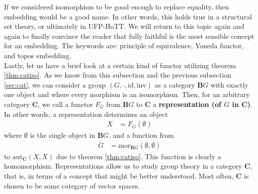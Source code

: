 If we considered isomorphism to be good enough to replace equality, then embedding would be a good name.
In other words, this holds true in a structural set theory, or ultimately in UFP-HoTT.
We will return to this topic again and again to finally convince the reader that fully faithful is the most sensible concept for an embedding.
The keywords are: principle of equivalence, Yoneda functor, and topos embedding.
\\
Lastly, let us have a brief look at a certain kind of functor utilizing theorem \ref{thm:catiso}.
As we know from this subsection and the previous subsection \ref{sec:cat}, we can consider a group $(G,\cdot,\mathrm{id},\mathrm{inv})$ as a category $\mathbf{B}G$ with exactly one object and where every morphism is an isomorphism.
Then, for an arbitrary category $\mathbf{C}$, we call a functor $F_{G}$ from $\mathbf{B}G$ to $\mathbf{C}$ a \textbf{representation (of $G$ in $\mathbf{C}$)}.
In other words, a representation determines an object
\begin{align*}
  X
  &=
  F_{G}(\emptyset)
\end{align*}
where $\emptyset$ is the single object in $\mathbf{B}G$, and a function from
\begin{align*}
  G
  &=
  \mathrm{mor}_{\mathbf{B}G}(\emptyset,\emptyset)
\end{align*}
to $\mathrm{aut}_{\mathbf{C}}(X,X)$ due to theorem \ref{thm:catiso}.
This function is clearly a homomorphism.
Representations allow us to study group theory in a category $\mathbf{C}$, that is, in terms of a concept that might be better understood.
Most often, $\mathbf{C}$ is chosen to be some category of vector spaces.
